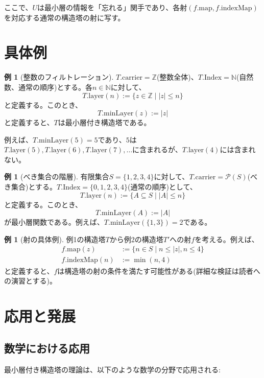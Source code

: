 \documentclass[a4paper,12pt]{article}
\theoremstyle{definition}
\newtheorem{example}[definition]{例}
\begin{document}
ここで、$U$は最小層の情報を「忘れる」関手であり、各射$(f.\text{map}, f.\text{indexMap})$を対応する通常の構造塔の射に写す。

\section{具体例}

\begin{example}[整数のフィルトレーション]
$T.\text{carrier} = \mathbb{Z}$(整数全体)、$T.\text{Index} = \mathbb{N}$(自然数、通常の順序)とする。各$n \in \mathbb{N}$に対して、
\[
T.\text{layer}(n) := \{z \in \mathbb{Z} \mid |z| \leq n\}
\]
と定義する。このとき、
\[
T.\text{minLayer}(z) := |z|
\]
と定義すると、$T$は最小層付き構造塔である。

例えば、$T.\text{minLayer}(5) = 5$であり、$5$は$T.\text{layer}(5), T.\text{layer}(6), T.\text{layer}(7), \ldots$に含まれるが、$T.\text{layer}(4)$には含まれない。
\end{example}

\begin{example}[べき集合の階層]
有限集合$S = \{1, 2, 3, 4\}$に対して、$T.\text{carrier} = \mathcal{P}(S)$(べき集合)とする。$T.\text{Index} = \{0, 1, 2, 3, 4\}$(通常の順序)として、
\[
T.\text{layer}(n) := \{A \subseteq S \mid |A| \leq n\}
\]
と定義する。このとき、
\[
T.\text{minLayer}(A) := |A|
\]
が最小層関数である。例えば、$T.\text{minLayer}(\{1, 3\}) = 2$である。
\end{example}

\begin{example}[射の具体例]
例1の構造塔$T$から例2の構造塔$T'$への射$f$を考える。例えば、
\begin{align*}
f.\text{map}(z) &:= \{n \in S \mid n \leq |z|, n \leq 4\} \\
f.\text{indexMap}(n) &:= \min(n, 4)
\end{align*}
と定義すると、$f$は構造塔の射の条件を満たす可能性がある(詳細な検証は読者への演習とする)。
\end{example}

\section{応用と発展}

\subsection{数学における応用}

最小層付き構造塔の理論は、以下のような数学の分野で応用される:
\end{document}

